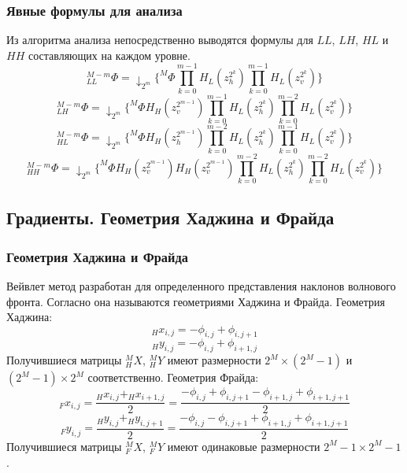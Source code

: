 \documentclass{article}
\begin{document}
\subsubsection{Явные формулы для анализа}
Из алгоритма анализа непосредственно выводятся формулы для $LL$, $LH$, $HL$ и $HH$ составляющих на каждом уровне.
\begin{equation}\label{LL}
_{LL}^{M-m}\Phi=
\downarrow_{2^m} \{^M\Phi\prod\limits_{k = 0}^{m-1} H_L(z_h^{2^k})
							\prod\limits_{k = 0}^{m-1} H_L(z_v^{2^k})\}
\end{equation}
\begin{equation}\label{LH}
_{LH}^{M-m}\Phi=
\downarrow_{2^m} \{^M\Phi H_H(z_v^{2^{m-1}}) \prod\limits_{k = 0}^{m-1} H_L(z_h^{2^k})
							\prod\limits_{k = 0}^{m-2} H_L(z_v^{2^k})\}
\end{equation}
\begin{equation}\label{HL}
_{HL}^{M-m}\Phi=\downarrow_{2^m} \{^M\Phi H_H(z_h^{2^{m-1}}) \prod\limits_{k = 0}^{m-2} H_L(z_h^{2^k})
						\prod\limits_{k = 0}^{m-1} H_L(z_v^{2^k})\}
\end{equation}
\begin{equation}\label{HH}
_{HH}^{M-m}\Phi=\downarrow_{2^m} \{^M\Phi H_H(z_v^{2^{m-1}}) H_H(z_v^{2^{m-1}}) \prod\limits_{k = 0}^{m-2} H_L(z_h^{2^k})
							\prod\limits_{k = 0}^{m-2} H_L(z_v^{2^k})\}
\end{equation}

\subsection{Градиенты. Геометрия Хаджина и Фрайда}
\subsubsection{Геометрия Хаджина и Фрайда}
Вейвлет метод разработан для определенного представления наклонов волнового фронта. Согласно \cite{how} она называются геометриями Хаджина и Фрайда.
Геометрия Хаджина:
$$_{H}x_{i,j}=-\phi_{i,j}+\phi_{i,j+1}$$
$$_{H}y_{i,j}=-\phi_{i,j}+\phi_{i+1,j}$$
Получившиеся матрицы $_H^{M}X$, $_H^{M}Y$ имеют размерности $2^M \times(2^M - 1)$ и $(2^M - 1) \times 2^M$ соответственно.
Геометрия Фрайда:
$$_{F}x_{i,j}=\frac{_{H}x_{i,j} + _{H}x_{i+1,j}}{2} = \frac{-\phi_{i,j}+\phi_{i,j+1}-\phi_{i+1,j}+\phi_{i+1,j+1}}{2}$$
$$_{F}y_{i,j}=\frac{_{H}y_{i,j} + _{H}y_{i,j+1}}{2} = \frac{-\phi_{i,j}-\phi_{i,j+1}+\phi_{i+1,j}+\phi_{i+1,j+1}}{2}$$
Получившиеся матрицы $_F^{M}X$, $_F^{M}Y$ имеют одинаковые размерности $2^M - 1 \times 2^M - 1$.
\end{document}
